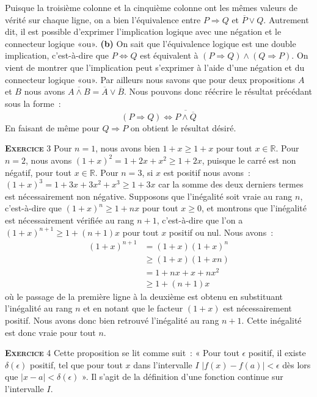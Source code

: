 \documentclass[10pt,a4paper,notitlepage]{article}
\newcommand{\exercice}[1]{\textsc{\textbf{Exercice}} #1}
\begin{document}
Puisque la troisième colonne et la cinquième colonne ont les mêmes valeurs de vérité sur chaque ligne, on a bien l'équivalence entre $P\Rightarrow Q$ et $\overline{P}\lor Q$. Autrement dit, il est possible d'exprimer l'implication logique avec une négation et le connecteur logique «ou». \textbf{(b)} On sait que l'équivalence logique est une double implication, c'est-à-dire que $P \Leftrightarrow Q$ est équivalent à $(P\Rightarrow Q) \land (Q\Rightarrow P)$. On vient de montrer que l'implication peut s'exprimer à l'aide d'une négation et du connecteur logique «ou». Par ailleurs nous savons que pour deux propositions $A$ et $B$ nous avons $\overline{A \land B} = \overline{A}\lor\overline{B}$. Nous pouvons donc réécrire le résultat précédant sous la forme :
\[
  (P \Rightarrow Q) \Leftrightarrow \overline{P \land \overline{Q}}
\]
En faisant de même pour $Q\Rightarrow P$ on obtient le résultat désiré.

\bigskip

\exercice{3} Pour $n=1$, nous avons bien $1+x\geq 1+x$ pour tout $x\in \mathbb R$. Pour $n=2$, nous avons  $(1+x)^2 = 1+2x+x^2 \geq 1+2x$, puisque le carré est non négatif, pour tout $x\in\mathbb R$. Pour $n=3$, si $x$ est positif nous avons : $(1+x)^3 = 1 + 3x + 3x^2 + x^3\geq 1+3x$ car la somme des deux derniers termes est nécessairement non négative. Supposons que l'inégalité soit vraie au rang $n$, c'est-à-dire que $(1+x)^n \geq 1+nx$ pour tout $x\geq 0$, et montrons que l'inégalité est nécessairement vérifiée au rang $n+1$, c'est-à-dire que l'on a $(1+x)^{n+1} \geq 1+(n+1)x$ pour tout $x$ positif ou nul. Nous avons :
\[
  \begin{split}
    (1+x)^{n+1} &= (1+x)(1+x)^n\\
    &\geq (1+x)(1+xn)\\
    &=1+nx+x+nx^2\\
    &\geq 1+(n+1)x
  \end{split}
\]
où le passage de la première ligne à la deuxième est obtenu en substituant l'inégalité au rang $n$ et en notant que le facteur $(1+x)$ est nécessairement positif. Nous avons donc bien retrouvé l'inégalité au rang $n+1$. Cette inégalité est donc vraie pour tout $n$. 

\bigskip

\exercice{4} Cette proposition se lit comme suit : « Pour tout $\epsilon$ positif, il existe $\delta(\epsilon)$ positif, tel que pour tout $x$ dans l'intervalle  $I$ $|f(x)-f(a)|<\epsilon$ dès lors que $|x-a|<\delta(\epsilon)$ ». Il s'agit de la définition d'une fonction continue sur l'intervalle $I$. 
\end{document}
